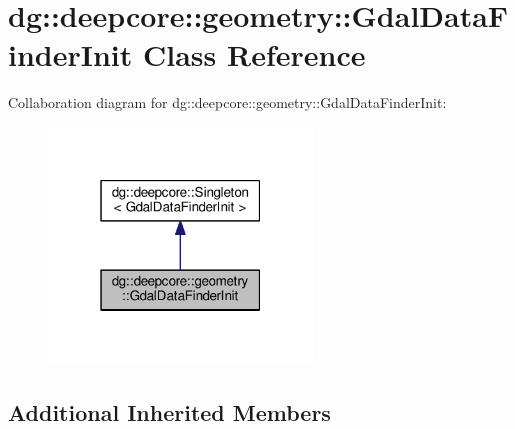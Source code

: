 \hypertarget{classdg_1_1deepcore_1_1geometry_1_1_gdal_data_finder_init}{}\section{dg\+:\+:deepcore\+:\+:geometry\+:\+:Gdal\+Data\+Finder\+Init Class Reference}
\label{classdg_1_1deepcore_1_1geometry_1_1_gdal_data_finder_init}


Collaboration diagram for dg\+:\+:deepcore\+:\+:geometry\+:\+:Gdal\+Data\+Finder\+Init\+:
\nopagebreak
\begin{figure}[H]
\begin{center}
\leavevmode
\includegraphics[width=199pt]{classdg_1_1deepcore_1_1geometry_1_1_gdal_data_finder_init__coll__graph}
\end{center}
\end{figure}
\subsection*{Additional Inherited Members}
